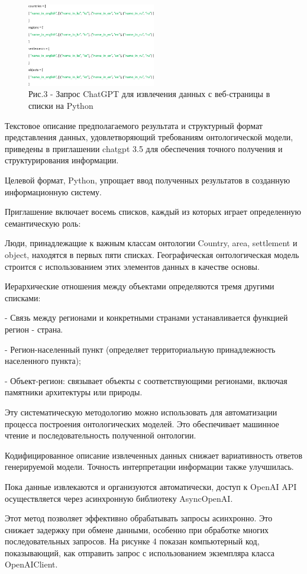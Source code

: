 \begin{figure}[H]
	\centering
	\includegraphics[width=0.5\textwidth]{media/ict2/image151}
	\caption*{Рис.3 - Запрос ChatGPT для извлечения данных с веб-страницы в списки на Python}
\end{figure}

\begin{multicols}{2}
Текстовое описание предполагаемого результата и структурный формат
представления данных, удовлетворяющий требованиям онтологической модели,
приведены в приглашении chatgpt 3.5 для обеспечения точного получения и
структурирования информации.

Целевой формат, Python, упрощает ввод полученных результатов в созданную
информационную систему.

Приглашение включает восемь списков, каждый из которых играет
определенную семантическую роль:

Люди, принадлежащие к важным классам онтологии Country, area, settlement
и object, находятся в первых пяти списках. Географическая онтологическая
модель строится с использованием этих элементов данных в качестве
основы.

Иерархические отношения между объектами определяются тремя другими
списками:

- Связь между регионами и конкретными странами устанавливается функцией
регион - страна.

- Регион-населенный пункт (определяет территориальную принадлежность
населенного пункта);

- Объект-регион: связывает объекты с соответствующими регионами, включая
памятники архитектуры или природы.

Эту систематическую методологию можно использовать для автоматизации
процесса построения онтологических моделей. Это обеспечивает машинное
чтение и последовательность полученной онтологии.

Кодифицированное описание извлеченных данных снижает вариативность
ответов генерируемой модели. Точность интерпретации информации также
улучшилась.

Пока данные извлекаются и организуются автоматически, доступ к OpenAI
API осуществляется через асинхронную библиотеку AsyncOpenAI.

Этот метод позволяет эффективно обрабатывать запросы асинхронно. Это
снижает задержку при обмене данными, особенно при обработке многих
последовательных запросов. На рисунке 4 показан компьютерный код,
показывающий, как отправить запрос с использованием экземпляра класса
OpenAIClient.
\end{multicols}

